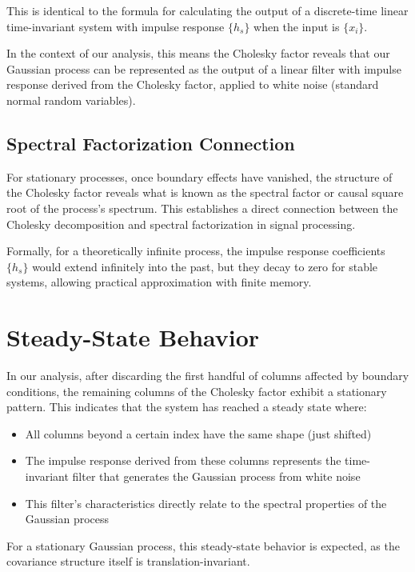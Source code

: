 \documentclass{article}
\begin{document}
This is identical to the formula for calculating the output of a discrete-time linear time-invariant system with impulse response $\{h_s\}$ when the input is $\{x_i\}$.

In the context of our analysis, this means the Cholesky factor reveals that our Gaussian process can be represented as the output of a linear filter with impulse response derived from the Cholesky factor, applied to white noise (standard normal random variables).

\subsection{Spectral Factorization Connection}

For stationary processes, once boundary effects have vanished, the structure of the Cholesky factor reveals what is known as the spectral factor or causal square root of the process's spectrum. This establishes a direct connection between the Cholesky decomposition and spectral factorization in signal processing.

Formally, for a theoretically infinite process, the impulse response coefficients $\{h_s\}$ would extend infinitely into the past, but they decay to zero for stable systems, allowing practical approximation with finite memory.

\section{Steady-State Behavior}

In our analysis, after discarding the first handful of columns affected by boundary conditions, the remaining columns of the Cholesky factor exhibit a stationary pattern. This indicates that the system has reached a steady state where:

\begin{itemize}
    \item All columns beyond a certain index have the same shape (just shifted)
    \item The impulse response derived from these columns represents the time-invariant filter that generates the Gaussian process from white noise
    \item This filter's characteristics directly relate to the spectral properties of the Gaussian process
\end{itemize}

For a stationary Gaussian process, this steady-state behavior is expected, as the covariance structure itself is translation-invariant.
\end{document}
